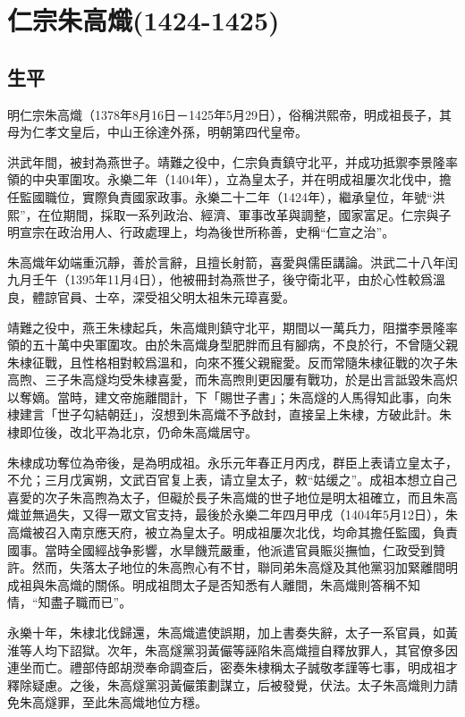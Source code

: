 
\section{仁宗朱高熾\tiny(1424-1425)}

\subsection{生平}

明仁宗朱高熾（1378年8月16日－1425年5月29日），俗稱洪熙帝，明成祖長子，其母为仁孝文皇后，中山王徐達外孫，明朝第四代皇帝。

洪武年間，被封為燕世子。靖難之役中，仁宗負責鎮守北平，并成功抵禦李景隆率領的中央軍圍攻。永樂二年（1404年），立為皇太子，并在明成祖屢次北伐中，擔任監國職位，實際負責國家政事。永樂二十二年（1424年），繼承皇位，年號“洪熙”，在位期間，採取一系列政治、經濟、軍事改革與調整，國家富足。仁宗與子明宣宗在政治用人、行政處理上，均為後世所称善，史稱“仁宣之治”。

朱高熾年幼端重沉靜，善於言辭，且擅长射箭，喜愛與儒臣講論。洪武二十八年闰九月壬午（1395年11月4日），他被冊封為燕世子，後守衛北平，由於心性較爲溫良，體諒官員、士卒，深受祖父明太祖朱元璋喜愛。

靖難之役中，燕王朱棣起兵，朱高熾則鎮守北平，期間以一萬兵力，阻擋李景隆率領的五十萬中央軍圍攻。由於朱高熾身型肥胖而且有腳病，不良於行，不曾隨父親朱棣征戰，且性格相對較爲溫和，向來不獲父親寵愛。反而常隨朱棣征戰的次子朱高煦、三子朱高燧均受朱棣喜愛，而朱高煦則更因屢有戰功，於是出言詆毀朱高炽以奪嫡。當時，建文帝施離間計，下「賜世子書」；朱高燧的人馬得知此事，向朱棣建言「世子勾結朝廷」，沒想到朱高熾不予啟封，直接呈上朱棣，方破此計。朱棣即位後，改北平為北京，仍命朱高熾居守。

朱棣成功奪位為帝後，是為明成祖。永乐元年春正月丙戌，群臣上表请立皇太子，不允；三月戊寅朔，文武百官复上表，请立皇太子，敕“姑缓之”。成祖本想立自己喜愛的次子朱高煦為太子，但礙於長子朱高熾的世子地位是明太祖確立，而且朱高熾並無過失，又得一眾文官支持，最後於永樂二年四月甲戌（1404年5月12日），朱高熾被召入南京應天府，被立為皇太子。明成祖屢次北伐，均命其擔任監國，負責國事。當時全國經战争影響，水旱饑荒嚴重，他派遣官員賑災撫恤，仁政受到贊許。然而，失落太子地位的朱高煦心有不甘，聯同弟朱高燧及其他黨羽加緊離間明成祖與朱高熾的關係。明成祖問太子是否知悉有人離間，朱高熾則答稱不知情，“知盡子職而已”。

永樂十年，朱棣北伐歸還，朱高熾遣使誤期，加上書奏失辭，太子一系官員，如黃淮等人均下詔獄。次年，朱高燧黨羽黃儼等誣陷朱高熾擅自釋放罪人，其官僚多因連坐而亡。禮部侍郎胡濙奉命調查后，密奏朱棣稱太子誠敬孝謹等七事，明成祖才釋除疑慮。之後，朱高燧黨羽黃儼策劃謀立，后被發覺，伏法。太子朱高熾則力請免朱高燧罪，至此朱高熾地位方穩。

